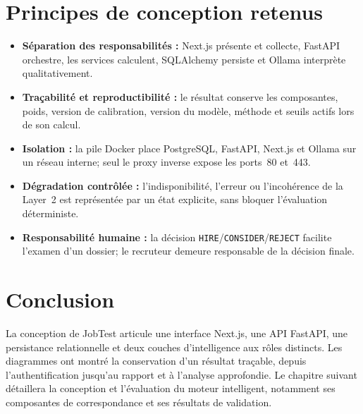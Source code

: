 \section{Principes de conception retenus}
\begin{itemize}
  \item \textbf{Séparation des responsabilités :} Next.js présente et collecte, FastAPI orchestre, les services calculent, SQLAlchemy persiste et Ollama interprète qualitativement.
  \item \textbf{Traçabilité et reproductibilité :} le résultat conserve les composantes, poids, version de calibration, version du modèle, méthode et seuils actifs lors de son calcul.
  \item \textbf{Isolation :} la pile Docker place PostgreSQL, FastAPI, Next.js et Ollama sur un réseau interne; seul le proxy inverse expose les ports~80 et~443.
  \item \textbf{Dégradation contrôlée :} l'indisponibilité, l'erreur ou l'incohérence de la Layer~2 est représentée par un état explicite, sans bloquer l'évaluation déterministe.
  \item \textbf{Responsabilité humaine :} la décision \texttt{HIRE}/\texttt{CONSIDER}/\texttt{REJECT} facilite l'examen d'un dossier; le recruteur demeure responsable de la décision finale.
\end{itemize}

\section*{Conclusion}
La conception de JobTest articule une interface Next.js, une API FastAPI, une persistance relationnelle et deux couches d'intelligence aux rôles distincts. Les diagrammes ont montré la conservation d'un résultat traçable, depuis l'authentification jusqu'au rapport et à l'analyse approfondie. Le chapitre suivant détaillera la conception et l'évaluation du moteur intelligent, notamment ses composantes de correspondance et ses résultats de validation.
